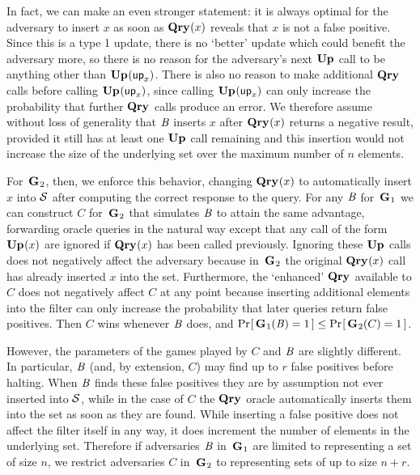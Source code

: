 In fact, we can make an even stronger statement: it is always optimal for the
adversary to insert $x$ as soon as $\textup{\textbf{Qry}}\hspace{0.5pt}(x)$ reveals that $x$ is not a false
positive. Since this is a type 1 update, there is no `better' update which could
benefit the adversary more, so there is no reason for the adversary's next
$\textup{\textbf{Up}}\hspace{0.5pt}$ call to be anything other than $\textup{\textbf{Up}}\hspace{0.5pt}(\mathsf{up}_x)$. There is also no reason to
make additional $\textup{\textbf{Qry}}\hspace{0.5pt}$ calls before calling $\textup{\textbf{Up}}\hspace{0.5pt}(\mathsf{up}_x)$, since calling
$\textup{\textbf{Up}}\hspace{0.5pt}(\mathsf{up}_x)$ can only increase the probability that further $\textup{\textbf{Qry}}\hspace{0.5pt}$ calls
produce an error. We therefore assume without loss of generality that $\mathit{B}$
inserts $x$ after $\textup{\textbf{Qry}}\hspace{0.5pt}(x)$ returns a negative result, provided it still has at
least one $\textup{\textbf{Up}}\hspace{0.5pt}$ call remaining and this insertion would not increase the size
of the underlying set over the maximum number of $n$ elements.

For~$\textup{\textbf{G}}\hspace{0.5pt}_2$, then, we enforce this behavior, changing $\textup{\textbf{Qry}}\hspace{0.5pt}(x)$ to
automatically insert $x$ into $\mathcal{S}$ after computing the correct response to the
query. For any $\mathit{B}$ for~$\textup{\textbf{G}}\hspace{0.5pt}_1$ we can construct $C$ for~$\textup{\textbf{G}}\hspace{0.5pt}_2$ that
simulates $\mathit{B}$ to attain the same advantage, forwarding oracle queries in the
natural way except that any call of the form $\textup{\textbf{Up}}\hspace{0.5pt}(x)$ are ignored if $\textup{\textbf{Qry}}\hspace{0.5pt}(x)$
has been called previously. Ignoring these $\textup{\textbf{Up}}\hspace{0.5pt}$ calls does not negatively
affect the adversary because in~$\textup{\textbf{G}}\hspace{0.5pt}_2$ the original $\textup{\textbf{Qry}}\hspace{0.5pt}(x)$ call has
already inserted $x$ into the set. Furthermore, the `enhanced' $\textup{\textbf{Qry}}\hspace{0.5pt}$ available
to $C$ does not negatively affect $C$ at any point because inserting additional
elements into the filter can only increase the probability that later queries
return false positives. Then $C$ wins whenever $\mathit{B}$ does, and
$\Pr\hspace{-1pt}\left[\,\textup{\textbf{G}}\hspace{0.5pt}_1(\mathit{B}) = 1\,\right] \le \Pr\hspace{-1pt}\left[\,\textup{\textbf{G}}\hspace{0.5pt}_2(C) = 1\,\right]$.
%

However, the parameters of the games played by $C$ and $\mathit{B}$ are slightly
different. In particular, $\mathit{B}$ (and, by extension, $C$) may find up to $r$
false positives before halting. When $\mathit{B}$ finds these false positives they
are by assumption not ever inserted into $\mathcal{S}$, while in the case of $C$ the
$\textup{\textbf{Qry}}\hspace{0.5pt}$ oracle automatically inserts them into the set as soon as they are
found. While inserting a false positive does not affect the filter itself in any
way, it does increment the number of elements in the underlying set. Therefore
if adversaries $\mathit{B}$ in~$\textup{\textbf{G}}\hspace{0.5pt}_1$ are limited to representing a set of size
$n$, we restrict adversaries $C$ in~$\textup{\textbf{G}}\hspace{0.5pt}_2$ to representing sets of up to size
$n+r$.

